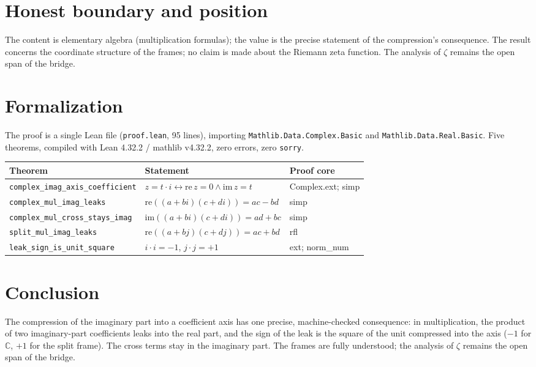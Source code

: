 \documentclass[sigplan,10pt,anonymous,review]{acmart}
\begin{document}
\section{Honest boundary and position}

The content is elementary algebra (multiplication formulas); the value
is the precise statement of the compression's consequence. The result
concerns the coordinate structure of the frames; no claim is made about
the Riemann zeta function. The analysis of $\zeta$ remains the open
span of the bridge.

\section{Formalization}

The proof is a single Lean file (\texttt{proof.lean}, 95 lines),
importing \texttt{Mathlib.Data.Complex.Basic} and
\texttt{Mathlib.Data.Real.Basic}. Five theorems, compiled with Lean
4.32.2 / mathlib v4.32.2, zero errors, zero \texttt{sorry}.

\begin{center}
\begin{tabular}{lll}
\toprule
Theorem & Statement & Proof core \\
\midrule
\texttt{complex\_imag\_axis\_coefficient} & $z = t \cdot i \leftrightarrow \mathrm{re}\, z = 0 \wedge \mathrm{im}\, z = t$ & Complex.ext; simp \\
\texttt{complex\_mul\_imag\_leaks} & $\mathrm{re}((a+bi)(c+di)) = ac - bd$ & simp \\
\texttt{complex\_mul\_cross\_stays\_imag} & $\mathrm{im}((a+bi)(c+di)) = ad + bc$ & simp \\
\texttt{split\_mul\_imag\_leaks} & $\mathrm{re}((a+bj)(c+dj)) = ac + bd$ & rfl \\
\texttt{leak\_sign\_is\_unit\_square} & $i \cdot i = -1$, $j \cdot j = +1$ & ext; norm\_num \\
\bottomrule
\end{tabular}
\end{center}

\section{Conclusion}

The compression of the imaginary part into a coefficient axis has one
precise, machine-checked consequence: in multiplication, the product of
two imaginary-part coefficients leaks into the real part, and the sign
of the leak is the square of the unit compressed into the axis ($-1$
for $\mathbb{C}$, $+1$ for the split frame). The cross terms stay in
the imaginary part. The frames are fully understood; the analysis of
$\zeta$ remains the open span of the bridge.



\end{document}
